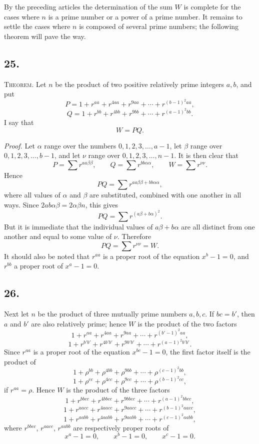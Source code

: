 \documentclass[12pt]{article}
\begin{document}
By the preceding articles the determination of the sum $W$ is complete for the cases where $n$ is a prime number or a power of a prime number. It remains to settle the cases where $n$ is composed of several prime numbers; the following theorem will pave the way.

\subsection*{25.}

\textsc{Theorem.} Let $n$ be the product of two positive relatively prime integers $a,b$, and put
\[
P=1+r^{aa}+r^{4aa}+r^{9aa}+\cdots+r^{(b-1)^2aa},
\]
\[
Q=1+r^{bb}+r^{4bb}+r^{9bb}+\cdots+r^{(a-1)^2bb}.
\]
I say that
\[
W=PQ.
\]

\emph{Proof.} Let $\alpha$ range over the numbers $0,1,2,3,\ldots,a-1$, let $\beta$ range over $0,1,2,3,\ldots,b-1$, and let $\nu$ range over $0,1,2,3,\ldots,n-1$. It is then clear that
\[
P=\sum r^{aa\beta\beta},\qquad Q=\sum r^{bb\alpha\alpha},\qquad W=\sum r^{\nu\nu}.
\]
Hence
\[
PQ=\sum r^{aa\beta\beta+bb\alpha\alpha},
\]
where all values of $\alpha$ and $\beta$ are substituted, combined with one another in all ways. Since $2ab\alpha\beta=2\alpha\beta n$, this gives
\[
PQ=\sum r^{(a\beta+b\alpha)^2}.
\]
But it is immediate that the individual values of $a\beta+b\alpha$ are all distinct from one another and equal to some value of $\nu$. Therefore
\[
PQ=\sum r^{\nu\nu}=W.
\]
It should also be noted that $r^{aa}$ is a proper root of the equation $x^b-1=0$, and $r^{bb}$ a proper root of $x^a-1=0$.

\subsection*{26.}

Next let $n$ be the product of three mutually prime numbers $a,b,c$. If $bc=b'$, then $a$ and $b'$ are also relatively prime; hence $W$ is the product of the two factors
\[
1+r^{aa}+r^{4aa}+r^{9aa}+\cdots+r^{(b'-1)^2aa},
\]
\[
1+r^{b'b'}+r^{4b'b'}+r^{9b'b'}+\cdots+r^{(a-1)^2b'b'}.
\]
Since $r^{aa}$ is a proper root of the equation $x^{bc}-1=0$, the first factor itself is the product of
\[
1+\rho^{bb}+\rho^{4bb}+\rho^{9bb}+\cdots+\rho^{(c-1)^2bb},
\]
\[
1+\rho^{cc}+\rho^{4cc}+\rho^{9cc}+\cdots+\rho^{(b-1)^2cc},
\]
if $r^{aa}=\rho$. Hence $W$ is the product of the three factors
\[
1+r^{bbcc}+r^{4bbcc}+r^{9bbcc}+\cdots+r^{(a-1)^2bbcc},
\]
\[
1+r^{aacc}+r^{4aacc}+r^{9aacc}+\cdots+r^{(b-1)^2aacc},
\]
\[
1+r^{aabb}+r^{4aabb}+r^{9aabb}+\cdots+r^{(c-1)^2aabb},
\]
where $r^{bbcc}$, $r^{aacc}$, $r^{aabb}$ are respectively proper roots of
\[
x^a-1=0,\qquad x^b-1=0,\qquad x^c-1=0.
\]
\end{document}
